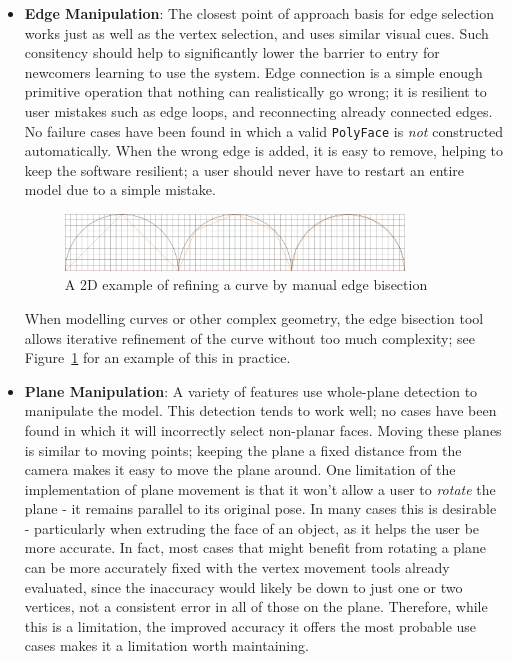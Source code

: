 \documentclass[a4paper,10pt]{article}
\begin{document}
\begin{itemize}
\item{\textbf{Edge Manipulation}: The closest point of approach basis for edge selection works just as well as the vertex selection, and uses similar visual cues. Such consitency should help to significantly lower the barrier to entry for newcomers learning to use the system. Edge connection is a simple enough primitive operation that nothing can realistically go wrong; it is resilient to user mistakes such as edge loops, and reconnecting already connected edges. No failure cases have been found in which a valid \texttt{PolyFace} is \textit{not} constructed automatically. When the wrong edge is added, it is easy to remove, helping to keep the software resilient; a user should never have to restart an entire model due to a simple mistake.

\begin{figure}
  \begin{center}
    \includegraphics[width=340px]{EdgeRefinement}
  \end{center}
  \caption{A 2D example of refining a curve by manual edge bisection}
  \label{refine}
\end{figure} 

When modelling curves or other complex geometry, the edge bisection tool allows iterative refinement of the curve without too much complexity; see Figure~\ref{refine} for an example of this in practice.}

\item{\textbf{Plane Manipulation}: A variety of features use whole-plane detection to manipulate the model. This detection tends to work well; no cases have been found in which it will incorrectly select non-planar faces. Moving these planes is similar to moving points; keeping the plane a fixed distance from the camera makes it easy to move the plane around. One limitation of the implementation of plane movement is that it won't allow a user to \textit{rotate} the plane - it remains parallel to its original pose. In many cases this is desirable - particularly when extruding the face of an object, as it helps the user be more accurate. In fact, most cases that might benefit from rotating a plane can be more accurately fixed with the vertex movement tools already evaluated, since the inaccuracy would likely be down to just one or two vertices, not a consistent error in all of those on the plane. Therefore, while this is a limitation, the improved accuracy it offers the most probable use cases makes it a limitation worth maintaining.

}
\end{itemize}
\end{document}
